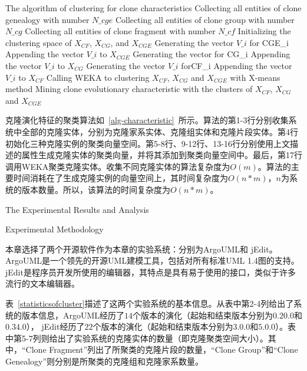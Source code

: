 \vspace{1em}
\begin{minipage}{0.9\textwidth}
\centering
\begin{algorithm}[H]
 {The algorithm of clustering for clone characteristics}
\label{alg-characteristic}
Collecting all entities of clone genealogy with number {$N\_cge$}\;
Collecting all entities of clone group with number{$N\_cg$}\;
Collecting all entities of clone fragment with number {$N\_cf$}\; 
Initializing the clustering space of  $X_{CF}$, $X_{CG}$, and $X_{CGE}$\;
{
 Generating the vector {$V\_i$} for {CGE\_i}\;
 Appending the vector {$V\_i$} to $X_{CGE}$\;
 }
{ 
 Generating the vector for {CG\_i}\;
 Appending the vector {$V\_i$} to $X_{CG}$\;
}
{ 
 Generating the vector {$V\_i$} for{CF\_i}\;
 Appending the vector {$V\_i$} to $X_{CF}$\;
}
Calling WEKA to clustering $X_{CF}$, $X_{CG}$ and  $X_{CGE}$ with X-means method\;
Mining clone evolutionary characteristic with the clusters of $X_{CF}$, $X_{CG}$ and  $X_{CGE}$\;
\end{algorithm}
\end{minipage}
\vspace{1em}

克隆演化特征的聚类算法如~\ref{alg-characteristic}~所示。算法的第1-3行分别收集系统中全部的克隆实体，分别为克隆家系实体、克隆组实体和克隆片段实体。第4行初始化三种克隆实例的聚类向量空间。第5-8行、9-12行、13-16行分别使用上文描述的属性生成克隆实体的聚类向量，并将其添加到聚类向量空间中。最后，第17行调用WEKA聚类克隆实体。收集不同克隆实体的算法复杂度为$O(m)$。算法的主要时间消耗在了生成克隆实例的向量空间上，其时间复杂度为$O(n*m)$，$n$为系统的版本数量。所以，该算法的时间复杂度为$O(n*m)$。

{The Experimental Results and Analysis}
\label{ref-characteristics}

{Experimental Methodology}

本章选择了两个开源软件作为本章的实验系统：分别为ArgoUML和 jEdit。ArgoUML是一个领先的开源UML建模工具，包括对所有标准UML 1.4图的支持。jEdit是程序员开发所使用的编辑器，其特点是具有易于使用的接口，类似于许多流行的文本编辑器。

表~\ref{statisticsofcluster}描述了这两个实验系统的基本信息。从表中第2-4列给出了系统的版本信息，ArgoUML经历了$14 $个版本的演化（起始和结束版本分别为$0.20.0$和$0.34.0$）， jEdit经历了$22$个版本的演化（起始和结束版本分别为$3.0.0$和$5.0.0$）。表中第5-7列则给出了实验系统的克隆实体的数量（即克隆聚类空间大小）。其中，“Clone Fragment”列出了所聚类的克隆片段的数量，“Clone Group”和“Clone Genealogy”则分别是所聚类的克隆组和克隆家系数量。

